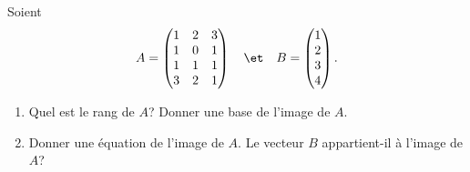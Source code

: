 \begin{enonce}
\begin{exercise}[ID={RMS134 E1389},subtitle={CCINP MP 2023},tags={},difficulty={}]
Soient
\begin{equation*}
  A= \begin{pmatrix} 1&2&3\\ 1&0&1\\ 1&1&1\\ 3&2&1\\ \end{pmatrix} 
    \quad\et\quad
  B=\begin{pmatrix} 1\\ 2\\ 3\\ 4\\ \end{pmatrix}.
\end{equation*}
\begin{enumerate}
  \item Quel est le rang de $A$? Donner une base de l'image de $A$.
  \item Donner une équation de l'image de $A$.
    Le vecteur $B$ appartient-il à l'image de $A$?
\end{enumerate}
\end{exercise}
\begin{solution}
\end{solution}
\end{enonce}
